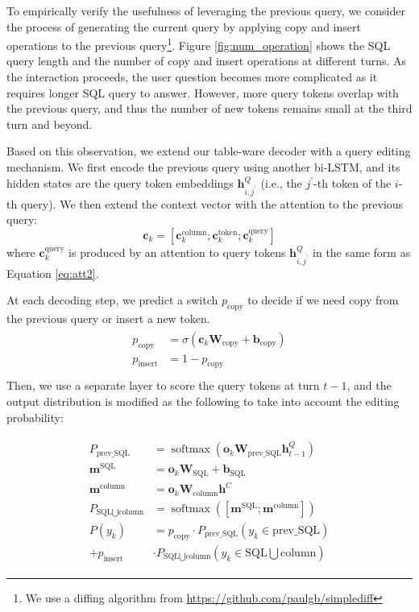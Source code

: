 \documentclass[11pt,a4paper]{article}
\newcommand{\newvec}[1]{\mathbf{#1}}
\DeclareMathOperator*{\softmax}{softmax}
\begin{document}
To empirically verify the usefulness of leveraging the previous query, 
we consider the process of generating the current query by applying copy and insert operations to the previous query\footnote{We use a diffing algorithm from \url{https://github.com/paulgb/simplediff}}.
Figure \ref{fig:num_operation} shows the SQL query length and the number of copy and insert operations at different turns.
As the interaction proceeds, the user question becomes more complicated as it requires longer SQL query to answer.
However, more query tokens overlap with the previous query, and thus the number of new tokens remains small at the third turn and beyond.

Based on this observation, we extend our table-ware decoder with a query editing mechanism.
We first encode the previous query using another bi-LSTM, and its hidden states are the query token embeddings $\newvec{h}^{Q}_{i,j^{\prime}}$ (i.e., the $j^{\prime}$-th token of the $i$-th query).
We then extend the context vector with the attention to the previous query:
\begin{equation*}
  \newvec{c}_k = [\newvec{c}_k^{\text{column}};\newvec{c}_k^{\text{token}};\newvec{c}_k^{\text{query}}]  
\end{equation*}
where $\newvec{c}_k^{\text{query}}$ is produced by an attention to query tokens $\newvec{h}^{Q}_{i,j^{\prime}}$ in the same form as Equation \ref{eq:att2}.

At each decoding step, we predict a switch $p_{\text{copy}}$ to decide if we need copy from the previous query or insert a new token.
\begin{align}
\label{eq:edit}
\begin{split}
p_{\text{copy}}    & = \sigma(\newvec{c}_{k}\newvec{W}_{\text{copy}} + \newvec{b}_{\text{copy}}) \\
p_{\text{insert}}  & = 1 - p_{\text{copy}} \\
\end{split}
\end{align}
Then, we use a separate layer to score the query tokens at turn $t-1$, and the output distribution is modified as the following to take into account the editing probability:


\begin{align}
\label{eq:edit2}
\begin{split}
P_\text{prev\_SQL} & = \softmax(\newvec{o}_{k}\newvec{W}_{\text{prev\_SQL}}\newvec{h}^{Q}_{t-1}) \\
\newvec{m}^{\text{SQL}} & = \newvec{o}_{k}\newvec{W}_{\text{SQL}} + \newvec{b}_{\text{SQL}} \\
\newvec{m}^{\text{column}} & = \newvec{o}_{k}\newvec{W}_{\text{column}}\newvec{h}^{C} \\
P_{\text{SQL} \bigcup \text{column}} & = \softmax([\newvec{m}^{\text{SQL}}; \newvec{m}^{\text{column}}]) \\
P(y_k) & = p_{\text{copy}} \cdot P_\text{prev\_SQL}(y_k \in \text{prev\_SQL}) \\
 + p_{\text{insert}} & \cdot P_{\text{SQL} \bigcup \text{column}}(y_k \in \text{SQL} \bigcup \text{column})
\end{split}
\end{align}
\end{document}
